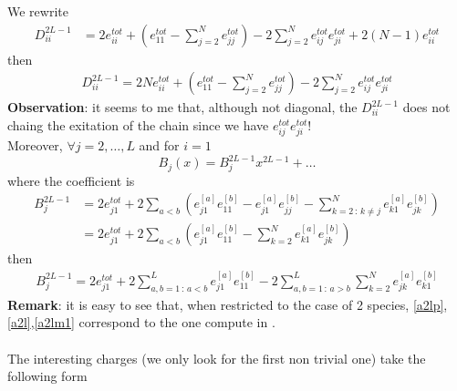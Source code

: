 \documentclass[11pt]{article}
\numberwithin{equation}{subsection}
\begin{document}
We rewrite
\begin{equation}
	\begin{split}
	D_{ii}^{2L-1}&=2e_{ii}^{tot}+\left(e_{11}^{tot}-\sum_{j=2}^{N}e_{jj}^{tot}\right)-2\sum_{j=2}^{N}e_{ij}^{tot}e_{ji}^{tot}+2(N-1)e_{ii}^{tot}
\end{split}
\end{equation}
then
\begin{equation}
\begin{split}
\boxed{D_{ii}^{2L-1}=	2Ne_{ii}^{tot}+\left(e_{11}^{tot}-\sum_{j=2}^{N}e_{jj}^{tot}\right)-2\sum_{j=2}^{N}e_{ij}^{tot}e_{ji}^{tot}}
	\end{split}
\end{equation}
\textbf{Observation}: it seems to me that, although not diagonal, the $D_{ii}^{2L-1}$ does not chaing the exitation of the chain since we have $e_{ij}^{tot}e_{ji}^{tot}$!\\
Moreover, $\forall j=2,\ldots,L$ and for $i=1$
\begin{equation}
	B_{j}(x)=B_{j}^{2L-1}x^{2L-1}+\ldots
\end{equation}
where the coefficient is 
\begin{equation}\label{b}
\begin{split}
	B_{j}^{2L-1}&=2e_{j1}^{tot}+2\sum_{a< b}\left(e_{j1}^{[a]}e_{11}^{[b]}-e_{j1}^{[a]}e_{jj}^{[b]}-\sum_{k=2\,:\,k\neq j}^{N}e_{k1}^{[a]}e_{jk}^{[b]}\right)\\
	&=2e_{j1}^{tot}+2\sum_{a< b}\left(e_{j1}^{[a]}e_{11}^{[b]}-\sum_{k=2}^{N}e_{k1}^{[a]}e_{jk}^{[b]}\right)
\end{split}
\end{equation}
then
\begin{equation}
\begin{split}
	\boxed{B_{j}^{2L-1}=2e_{j1}^{tot}+
	2\sum_{a,b=1\,:\, a<b}^{L}e_{j1}^{[a]}e_{11}^{[b]}-2\sum_{a,b=1\,:\, a>b}^{L}\sum_{k=2}^{N}e_{jk}^{[a]}e_{k1}^{[b]}}
\end{split}
\end{equation}
\textbf{Remark}: it is easy to see that, when restricted to the case of 2 species,  \eqref{a2lp},\eqref{a2l},\eqref{a2lm1} correspond to the one compute in \cite{frassek2020eigenstates}. \\ \\
The interesting charges (we only look for the first non trivial one) take the following form  
\end{document}
